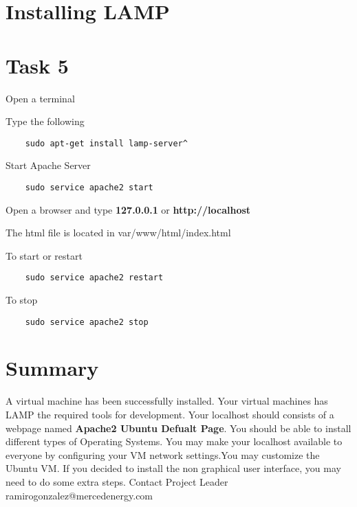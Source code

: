 \documentclass[12pt]{article}
\begin{document}
\section*{ Installing LAMP}
\section*{Task 5}
\begin{todolist}
    \item Open a terminal 
    \item  Type the following \\
    \begin{lstlisting}
    sudo apt-get install lamp-server^
    \end{lstlisting}
    \item Start Apache Server 
    \begin{lstlisting}
    sudo service apache2 start
    \end{lstlisting}
    \item Open a browser and type \textbf{127.0.0.1} or \textbf{http://localhost}
    \item The html file is located in var/www/html/index.html
    \item To start or restart 
    \begin{lstlisting}
    sudo service apache2 restart
    \end{lstlisting}
    \item To stop
    \begin{lstlisting}
    sudo service apache2 stop
    \end{lstlisting}
\end{todolist}
\section*{Summary}
A virtual machine has been successfully installed. Your virtual machines has LAMP the required tools for development. Your localhost should consists of a webpage named \textbf{Apache2 Ubuntu Defualt Page}. You should be able to install different types of Operating Systems. 
You may make your localhost available to everyone by configuring your VM network settings.You may customize the Ubuntu VM. If you decided to install the non graphical user interface, you may need to do some extra steps. Contact Project Leader ramirogonzalez@mercedenergy.com
\end{document}
